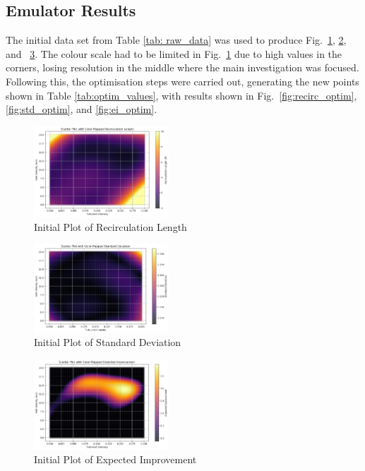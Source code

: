 \documentclass[conference]{IEEEtran}
\begin{document}
\subsection{Emulator Results}
The initial data set from Table \ref{tab: raw_data} was used to produce Fig.~\ref{fig:recirc_orig}, \ref{fig:std_orig}, and ~\ref{fig:ei_orig}. The colour scale had to be limited in Fig.~\ref{fig:recirc_orig} due to high values in the corners, losing resolution in the middle where the main investigation was focused. Following this, the optimisation steps were carried out, generating the new points shown in Table \ref{tab:optim_values}, with results shown in Fig.~\ref{fig:recirc_optim}, \ref{fig:std_optim}, and \ref{fig:ei_optim}.

\begin{figure}[ht]
    \centering
    \includegraphics[width = 0.45\textwidth]{Images/recirc_orig.png}
    \caption{Initial Plot of Recirculation Length}
    \label{fig:recirc_orig}
\end{figure}
\begin{figure}[ht]
    \centering
    \includegraphics[width = 0.45\textwidth]{Images/std_orig.png}
    \caption{Initial Plot of Standard Deviation}
    \label{fig:std_orig}
\end{figure}
\begin{figure}[ht]
    \centering
    \includegraphics[width = 0.45\textwidth]{Images/ei_orig.png}
    \caption{Initial Plot of Expected Improvement}
    \label{fig:ei_orig}
\end{figure}
\end{document}
